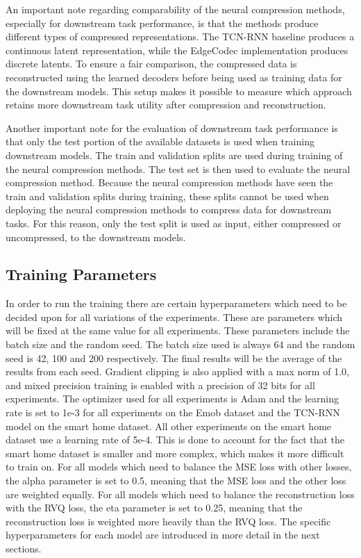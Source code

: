 An important note regarding comparability of the neural compression methods, especially for downstream task performance, is that the methods produce different types of compressed representations. The TCN-RNN baseline produces a continuous latent representation, while the EdgeCodec implementation produces discrete latents. To ensure a fair comparison, the compressed data is reconstructed using the learned decoders before being used as training data for the downstream models. This setup makes it possible to measure which approach retains more downstream task utility after compression and reconstruction.

Another important note for the evaluation of downstream task performance is that only the test portion of the available datasets is used when training downstream models. The train and validation splits are used during training of the neural compression methods. The test set is then used to evaluate the neural compression method. Because the neural compression methods have seen the train and validation splits during training, these splits cannot be used when deploying the neural compression methods to compress data for downstream tasks. For this reason, only the test split is used as input, either compressed or uncompressed, to the downstream models.

\subsection{Training Parameters}

In order to run the training there are certain hyperparameters which need to be decided upon for all variations of the experiments. These are parameters which will be fixed at the same value for all experiments. These parameters include the batch size and the random seed. The batch size used is always 64 and the random seed is 42, 100 and 200 respectively. The final results will be the average of the results from each seed. Gradient clipping is also applied with a max norm of 1.0, and mixed precision training is enabled with a precision of 32 bits for all experiments. The optimizer used for all experiments is Adam and the learning rate is set to 1e-3 for all experiments on the Emob dataset and the TCN-RNN model on the smart home dataset. All other experiments on the smart home dataset use a learning rate of 5e-4. This is done to account for the fact that the smart home dataset is smaller and more complex, which makes it more difficult to train on. For all models which need to balance the MSE loss with other losses, the alpha parameter is set to 0.5, meaning that the MSE loss and the other loss are weighted equally. For all models which need to balance the reconstruction loss with the RVQ loss, the eta parameter is set to 0.25, meaning that the reconstruction loss is weighted more heavily than the RVQ loss. The specific hyperparameters for each model are introduced in more detail in the next sections.

